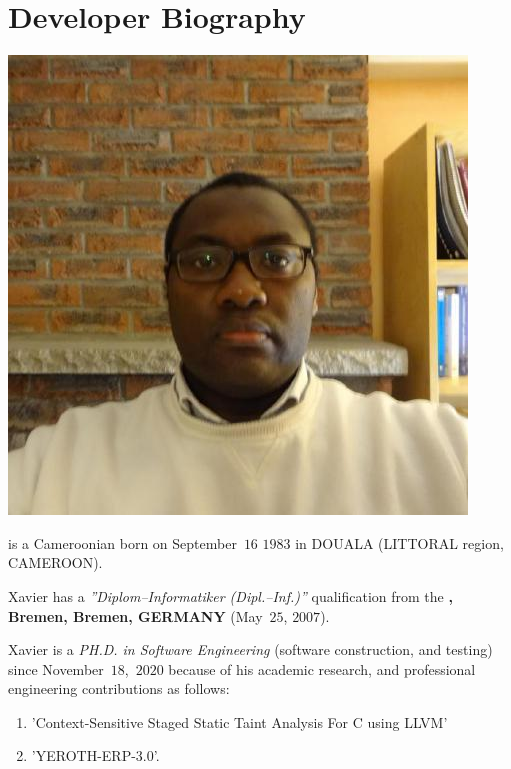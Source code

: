 \section{Developer Biography}\label{chap:biography}
\vspace{-0.9em}

\begin{center}
\includegraphics[scale=0.32]{../../francais/images/XavierNOUNDOU-2}
\end{center}

\textbf{\myfullacademicname} is a Cameroonian
born on September~$16$ $1983$ in DOUALA (LITTORAL region, CAMEROON).

Xavier has a \textit{''Diplom--Informatiker (Dipl.--Inf.)''}
qualification from the \textbf{\unibremen, Bremen, Bremen, GERMANY} (May~$25$, $2007$).

Xavier is a \textit{PH.D. in Software Engineering}
(software construction, and testing) since November~$18$,~$2020$
because of his academic research, and professional engineering
contributions as follows:

\begin{enumerate}
	\item 'Context-Sensitive Staged Static Taint Analysis
			For C using LLVM'
	\item 'YEROTH-ERP-3.0'.
\end{enumerate}
